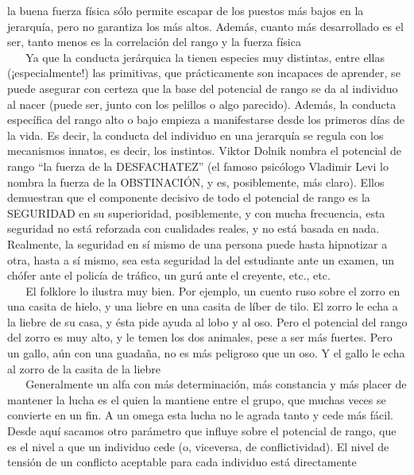 la buena fuerza física sólo permite escapar de los puestos más bajos en
la jerarquía, pero no garantiza los más altos. Además, cuanto más
desarrollado es el ser, tanto menos es la correlación del rango y la
fuerza física\\
\hspace*{0.333em} ~ ~ Ya que la conducta jerárquica la tienen especies
muy distintas, entre ellas (¡especialmente!) las primitivas, que
prácticamente son incapaces de aprender, se puede asegurar con certeza
que la base del potencial de rango se da al individuo al nacer (puede
ser, junto con los pelillos o algo parecido). Además, la conducta
específica del rango alto o bajo empieza a manifestarse desde los
primeros días de la vida. Es decir, la conducta del individuo en una
jerarquía se regula con los mecanismos innatos, es decir, los instintos.
Viktor Dolnik nombra el potencial de rango ``la fuerza de la
DESFACHATEZ'' (el famoso psicólogo Vladimir Levi lo nombra la fuerza de
la OBSTINACIÓN, y es, posiblemente, más claro). Ellos demuestran que el
componente decisivo de todo el potencial de rango es la SEGURIDAD en su
superioridad, posiblemente, y con mucha frecuencia, esta seguridad no
está reforzada con cualidades reales, y no está basada en nada.
Realmente, la seguridad en sí mismo de una persona puede hasta
hipnotizar a otra, hasta a sí mismo, sea esta seguridad la del
estudiante ante un examen, un chófer ante el policía de tráfico, un gurú
ante el creyente, etc., etc.\\
\hspace*{0.333em} ~ ~ El folklore lo ilustra muy bien. Por ejemplo, un
cuento ruso sobre el zorro en una casita de hielo, y una liebre en una
casita de líber de tilo. El zorro le echa a la liebre de su casa, y ésta
pide ayuda al lobo y al oso. Pero el potencial del rango del zorro es
muy alto, y le temen los dos animales, pese a ser más fuertes. Pero un
gallo, aún con una guadaña, no es más peligroso que un oso. Y el gallo
le echa al zorro de la casita de la liebre\\
\hspace*{0.333em} ~ ~ Generalmente un alfa con más determinación, más
constancia y más placer de mantener la lucha es el quien la mantiene
entre el grupo, que muchas veces se convierte en un fin. A un omega esta
lucha no le agrada tanto y cede más fácil. Desde aquí sacamos otro
parámetro que influye sobre el potencial de rango, que es el nivel a que
un individuo cede (o, viceversa, de conflictividad). El nivel de tensión
de un conflicto aceptable para cada individuo está directamente

